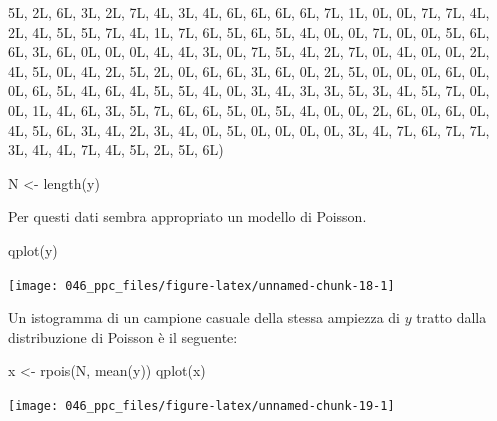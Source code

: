 \documentclass[
  10pt,
  italian,
  a4paper,
  extrafontsizes,onecolumn,openright
  ]{memoir}
\newenvironment{Shaded}{\begin{snugshade}}{\end{snugshade}}
\newcommand{\FunctionTok}[1]{\textcolor[rgb]{0.00,0.00,0.00}{#1}}
\newcommand{\NormalTok}[1]{#1}
\newcommand{\OtherTok}[1]{\textcolor[rgb]{0.56,0.35,0.01}{#1}}
\begin{document}
\begin{Shaded}
\begin{Highlighting}[]
\NormalTok{       5L, 2L, 6L, 3L, 2L, 7L, 4L, 3L, 4L, }
\NormalTok{       6L, 6L, 6L, 6L, 7L, 1L, 0L, 0L, 7L, }
\NormalTok{       7L, 4L, 2L, 4L, 5L, 5L, 7L, 4L, 1L, }
\NormalTok{       7L, 6L, 5L, 6L, 5L, 4L, 0L, 0L, 7L, }
\NormalTok{       0L, 0L, 5L, 6L, 6L, 3L, 6L, 0L, 0L, }
\NormalTok{       0L, 4L, 4L, 3L, 0L, 7L, 5L, 4L, 2L, }
\NormalTok{       7L, 0L, 4L, 0L, 0L, 2L, 4L, 5L, 0L, }
\NormalTok{       4L, 2L, 5L, 2L, 0L, 6L, 6L, 3L, 6L, }
\NormalTok{       0L, 2L, 5L, 0L, 0L, 0L, 6L, 0L, 0L, }
\NormalTok{       6L, 5L, 4L, 6L, 4L, 5L, 5L, 4L, 0L, }
\NormalTok{       3L, 4L, 3L, 3L, 5L, 3L, 4L, 5L, 7L, }
\NormalTok{       0L, 0L, 1L, 4L, 6L, 3L, 5L, 7L, 6L, }
\NormalTok{       6L, 5L, 0L, 5L, 4L, 0L, 0L, 2L, 6L, }
\NormalTok{       0L, 6L, 0L, 4L, 5L, 6L, 3L, 4L, 2L, }
\NormalTok{       3L, 4L, 0L, 5L, 0L, 0L, 0L, 0L, 3L, }
\NormalTok{       4L, 7L, 6L, 7L, 7L, 3L, 4L, 4L, 7L, }
\NormalTok{       4L, 5L, 2L, 5L, 6L)}

\NormalTok{N }\OtherTok{\textless{}{-}} \FunctionTok{length}\NormalTok{(y)}
\end{Highlighting}
\end{Shaded}

\noindent
Per questi dati sembra appropriato un modello di Poisson.

\begin{Shaded}
\begin{Highlighting}[]
\FunctionTok{qplot}\NormalTok{(y)}
\end{Highlighting}
\end{Shaded}

\begin{center}\texttt{[image: 046\_ppc\_files/figure-latex/unnamed-chunk-18-1]} \end{center}

\noindent
Un istogramma di un campione casuale della stessa ampiezza di \(y\) tratto dalla distribuzione di Poisson è il seguente:

\begin{Shaded}
\begin{Highlighting}[]
\NormalTok{x }\OtherTok{\textless{}{-}} \FunctionTok{rpois}\NormalTok{(N, }\FunctionTok{mean}\NormalTok{(y))}
\FunctionTok{qplot}\NormalTok{(x)}
\end{Highlighting}
\end{Shaded}

\begin{center}\texttt{[image: 046\_ppc\_files/figure-latex/unnamed-chunk-19-1]} \end{center}
\end{document}
